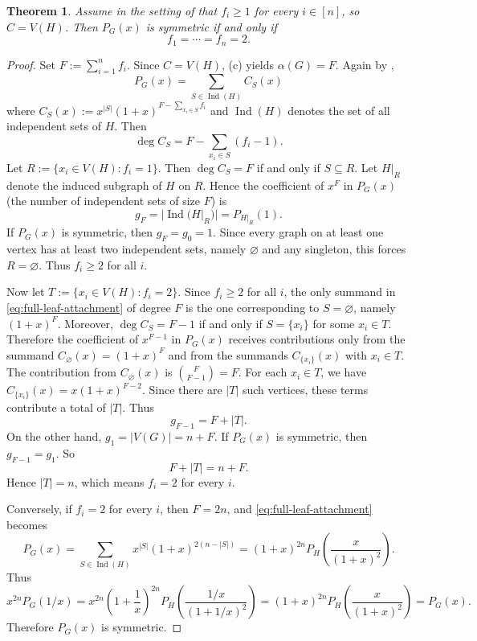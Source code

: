 \documentclass[12pt]{amsart}
\theoremstyle{plain}
\newtheorem{thm}{Theorem}[section]
\theoremstyle{definition}
\DeclareMathOperator{\Ind}{Ind}
\begin{document}
\begin{thm}\label{thm:full_leaf_attachment_symmetric}
Assume in the setting of  that \(f_i\geq 1\) for every
\(i\in [n]\), so \(C=V(H)\). Then \(P_G(x)\) is symmetric if and only if
\[
f_1=\cdots=f_n=2.
\]
\end{thm}


\begin{proof}
Set $F:=\sum_{i=1}^n f_i$. Since \(C=V(H)\), \textup{(c)} yields $\alpha(G)=F$. Again by ,
\begin{equation}\label{eq:full-leaf-attachment}
P_G(x)=\sum_{S\in \Ind(H)} C_S(x)
\end{equation}
where $C_S(x):=x^{|S|}(1+x)^{F-\sum_{x_i\in S}f_i}$ and  $\Ind(H)$ denotes the set of all independent sets of $H$.
Then
\[
\deg C_S=F-\sum_{x_i\in S}(f_i-1).
\]
Let $R:=\{x_i\in V(H): f_i=1\}$.
Then \(\deg C_S=F\) if and only if \(S\subseteq R\). Let $H|_R$ denote the induced subgraph of $H$ on $R$. Hence the coefficient of
\(x^F\) in \(P_G(x)\) (the number of independent sets of size $F$) is
\[
g_F=|\Ind(H|_R)|=P_{H|_R}(1).
\]
 If \(P_G(x)\) is symmetric, then \(g_F=g_0=1\). Since every graph on at least
one vertex has at least two independent sets, namely \(\varnothing\) and any
singleton, this forces \(R=\varnothing\). Thus \(f_i\geq 2\) for all \(i\).

Now let $T:=\{x_i\in V(H): f_i=2\}$.
Since \(f_i\geq 2\) for all \(i\), the only summand in
\eqref{eq:full-leaf-attachment} of degree \(F\) is the one corresponding to
\(S=\varnothing\), namely \((1+x)^F\). Moreover, \(\deg C_S=F-1\) if and only
if \(S=\{x_i\}\) for some \(x_i\in T\). Therefore the coefficient of \(x^{F-1}\) in \(P_G(x)\) receives contributions only
from the summand \(C_\varnothing(x)=(1+x)^F\) and from the summands
\(C_{\{x_i\}}(x)\) with \(x_i\in T\). The contribution from \(C_\varnothing(x)\) is $\binom{F}{F-1}=F$. For each \(x_i\in T\), we have $C_{\{x_i\}}(x)=x(1+x)^{F-2}$. Since there are \(|T|\) such vertices, these terms contribute a total of \(|T|\).
Thus
\[
g_{F-1}=F+|T|.
\]
On the other hand, \(g_1=|V(G)|=n+F\). If \(P_G(x)\) is symmetric, then
\(g_{F-1}=g_1\). So
\[
F+|T|=n+F.
\]
Hence \(|T|=n\), which means \(f_i=2\) for every \(i\).

Conversely, if \(f_i=2\) for every \(i\), then \(F=2n\), and
\eqref{eq:full-leaf-attachment} becomes
\[
P_G(x)
=
\sum_{S\in \Ind(H)} x^{|S|}(1+x)^{2(n-|S|)}
=
(1+x)^{2n}
P_H\!\left(\frac{x}{(1+x)^2}\right).
\]
Thus
$$
x^{2n}P_G(1/x)
=
x^{2n}\left(1+\frac1x\right)^{2n}
P_H\!\left(\frac{1/x}{(1+1/x)^2}\right) =
(1+x)^{2n}P_H\!\left(\frac{x}{(1+x)^2}\right)
=
P_G(x).
$$
Therefore \(P_G(x)\) is symmetric.
\end{proof}
\end{document}
